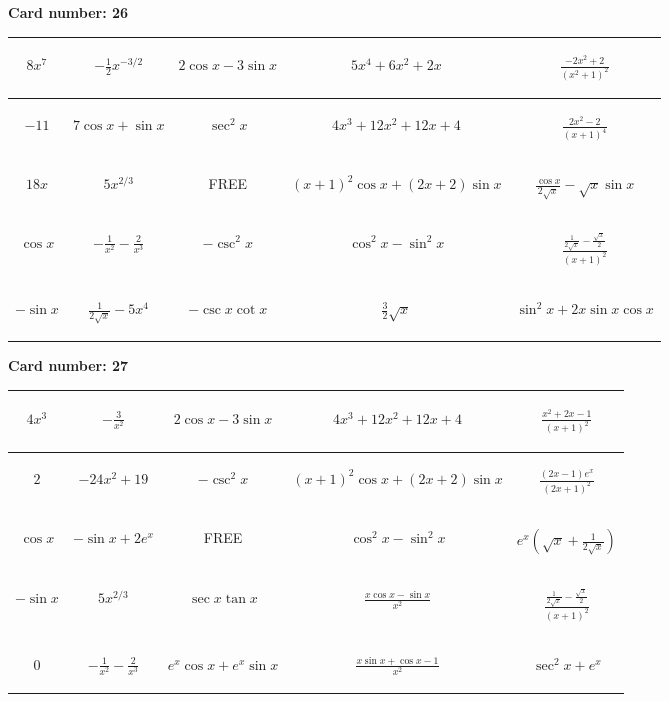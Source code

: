 \documentclass{article}
\newcommand{\entry}[1]{\begin{minipage}[t][2.75cm][t]{4cm} \vspace{1cm} \begin{center}#1\end{center} \end{minipage}}
\newcommand{\freespace}{\entry{FREE}}
\newcommand{\cardnumber}[1]{\noindent \textbf{Card number: #1} \bigskip}
\begin{document}
\pagebreak

\cardnumber{26}
\begin{center}
\begin{tabular}{|*{5}{c|}}
    \hline
    \entry{$8x^7$} & \entry{$-\frac{1}{2} x^{-3/2}$} & \entry{$2 \cos x - 3 \sin x$} & \entry{$5x^4 + 6x^2 + 2x$} & \entry{$\frac{-2x^2 + 2}{(x^2 + 1)^2}$} \\ \hline
    \entry{$-11$} & \entry{$7 \cos x + \sin x$} & \entry{$\sec^2 x$} & \entry{$4x^3 + 12x^2 + 12x + 4$} & \entry{$\frac{2x^2 - 2}{(x + 1)^4}$} \\ \hline
    \entry{$18x$} & \entry{$5x^{2/3}$} & \freespace & \entry{$(x + 1)^2 \cos x + (2x + 2) \sin x$} & \entry{$\frac{\cos x}{2 \sqrt{x}} - \sqrt{x} \sin x$} \\ \hline
    \entry{$\cos x$} & \entry{$-\frac{1}{x^2} - \frac{2}{x^3}$} & \entry{$-\csc^2 x$} & \entry{$\cos^2 x - \sin^2 x$} & \entry{$\frac{\frac{1}{2 \sqrt{x}} - \frac{\sqrt{x}}{2}}{(x + 1)^2}$} \\ \hline
    \entry{$-\sin x$} & \entry{$\frac{1}{2\sqrt{x}} - 5x^4$} & \entry{$-\csc x \cot x$} & \entry{$\frac{3}{2} \sqrt{x}$} & \entry{$\sin^2 x + 2x \sin x \cos x$} \\ \hline
\end{tabular}
\end{center}

\pagebreak

\cardnumber{27}
\begin{center}
\begin{tabular}{|*{5}{c|}}
    \hline
    \entry{$4x^3$} & \entry{$-\frac{3}{x^2}$} & \entry{$2 \cos x - 3 \sin x$} & \entry{$4x^3 + 12x^2 + 12x + 4$} & \entry{$\frac{x^2 + 2x - 1}{(x + 1)^2}$} \\ \hline
    \entry{$2$} & \entry{$-24x^2 + 19$} & \entry{$-\csc^2 x$} & \entry{$(x + 1)^2 \cos x + (2x + 2) \sin x$} & \entry{$\frac{(2x - 1) e^x}{(2x + 1)^2}$} \\ \hline
    \entry{$\cos x$} & \entry{$-\sin x + 2e^x$} & \freespace & \entry{$\cos^2 x - \sin^2 x$} & \entry{$e^x \left(\sqrt{x} + \frac{1}{2\sqrt{x}}\right)$} \\ \hline
    \entry{$-\sin x$} & \entry{$5x^{2/3}$} & \entry{$\sec x \tan x$} & \entry{$\frac{x \cos x - \sin x}{x^2}$} & \entry{$\frac{\frac{1}{2 \sqrt{x}} - \frac{\sqrt{x}}{2}}{(x + 1)^2}$} \\ \hline
    \entry{$0$} & \entry{$-\frac{1}{x^2} - \frac{2}{x^3}$} & \entry{$e^x \cos x + e^x \sin x$} & \entry{$\frac{x \sin x + \cos x - 1}{x^2}$} & \entry{$\sec^2 x + e^x$} \\ \hline
\end{tabular}
\end{center}
\end{document}
